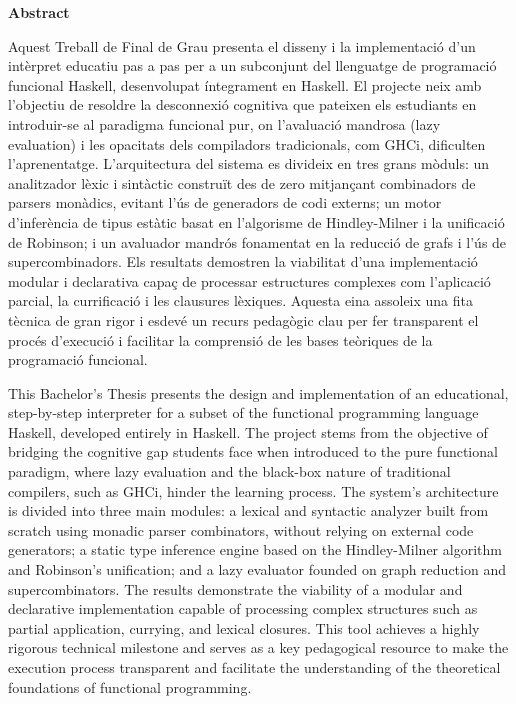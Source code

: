 \begin{center}
\textbf{Abstract}
\end{center}

Aquest Treball de Final de Grau presenta el disseny i la implementació d'un intèrpret educatiu pas a pas per a un subconjunt del llenguatge de programació funcional Haskell, desenvolupat íntegrament en Haskell. El projecte neix amb l'objectiu de resoldre la desconnexió cognitiva que pateixen els estudiants en introduir-se al paradigma funcional pur, on l'avaluació mandrosa (lazy evaluation) i les opacitats dels compiladors tradicionals, com GHCi, dificulten l'aprenentatge. L'arquitectura del sistema es divideix en tres grans mòduls: un analitzador lèxic i sintàctic construït des de zero mitjançant combinadors de parsers monàdics, evitant l'ús de generadors de codi externs; un motor d'inferència de tipus estàtic basat en l'algorisme de Hindley-Milner i la unificació de Robinson; i un avaluador mandrós fonamentat en la reducció de grafs i l'ús de supercombinadors. Els resultats demostren la viabilitat d'una implementació modular i declarativa capaç de processar estructures complexes com l'aplicació parcial, la currificació i les clausures lèxiques. Aquesta eina assoleix una fita tècnica de gran rigor i esdevé un recurs pedagògic clau per fer transparent el procés d'execució i facilitar la comprensió de les bases teòriques de la programació funcional.


This Bachelor's Thesis presents the design and implementation of an educational, step-by-step interpreter for a subset of the functional programming language Haskell, developed entirely in Haskell. The project stems from the objective of bridging the cognitive gap students face when introduced to the pure functional paradigm, where lazy evaluation and the black-box nature of traditional compilers, such as GHCi, hinder the learning process. The system's architecture is divided into three main modules: a lexical and syntactic analyzer built from scratch using monadic parser combinators, without relying on external code generators; a static type inference engine based on the Hindley-Milner algorithm and Robinson's unification; and a lazy evaluator founded on graph reduction and supercombinators. The results demonstrate the viability of a modular and declarative implementation capable of processing complex structures such as partial application, currying, and lexical closures. This tool achieves a highly rigorous technical milestone and serves as a key pedagogical resource to make the execution process transparent and facilitate the understanding of the theoretical foundations of functional programming.

